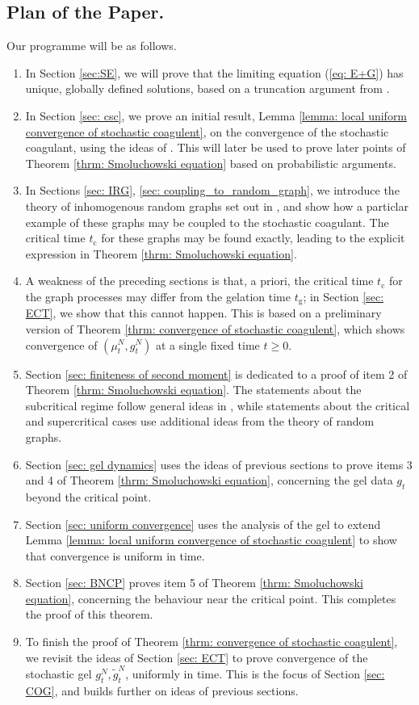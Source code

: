 \documentclass[11pt, notitlepage]{article}
\begin{document}
\subsection{\textbf{Plan of the Paper.}} Our programme will be as follows. \begin{enumerate} \item In Section \ref{sec:SE}, we will prove that the limiting equation (\ref{eq: E+G}) has unique, globally defined solutions, based on a truncation argument from \cite{N99,N00}.
\item In Section \ref{sec: csc}, we prove an initial result, Lemma \ref{lemma: local uniform convergence of stochastic coagulent}, on the convergence of the stochastic coagulant, using the ideas of \cite[Theorem 4.1]{N00}. This will later be used to prove later points of Theorem \ref{thrm: Smoluchowski equation} based on probabilistic arguments.
\item In Sections \ref{sec: IRG}, \ref{sec: coupling_to_random_graph}, we introduce the theory of inhomogenous random graphs set out in \cite{BJR07}, and show how a particlar example of these graphs may be coupled to the stochastic coagulant. The critical time $t_\mathrm{c}$ for these graphs may be found exactly, leading to the explicit expression in Theorem \ref{thrm: Smoluchowski equation}. \item A weakness of the preceding sections is that, a priori, the critical time $t_\mathrm{c}$ for the graph processes may differ from the gelation time $t_\mathrm{g}$; in Section \ref{sec: ECT}, we show that this cannot happen. This is based on a preliminary version of Theorem \ref{thrm: convergence of stochastic coagulent}, which shows convergence of $(\mu^N_t, g^N_t)$ at a single fixed time $t\ge 0$. 
\item Section \ref{sec: finiteness of second moment} is dedicated to a proof of item 2 of Theorem \ref{thrm: Smoluchowski equation}. The statements about the subcritical regime follow general ideas in \cite{N99,N00}, while statements about the critical and supercritical cases use additional ideas from the theory of random graphs.
\item Section \ref{sec: gel dynamics} uses the ideas of previous sections to prove items 3 and 4 of Theorem \ref{thrm: Smoluchowski equation}, concerning the gel data $g_t$ beyond the critical point. \item Section \ref{sec: uniform convergence} uses the analysis of the gel to extend Lemma \ref{lemma: local uniform convergence of stochastic coagulent} to show that convergence is uniform in time.
\item Section \ref{sec: BNCP} proves item 5 of Theorem \ref{thrm: Smoluchowski equation}, concerning the behaviour near the critical point. This completes the proof of this theorem. \item To finish the proof of Theorem \ref{thrm: convergence of stochastic coagulent}, we revisit the ideas of Section \ref{sec: ECT} to prove convergence of the stochastic gel $g^N_t, \widetilde{g}^N_t$, uniformly in time. This is the focus of Section \ref{sec: COG}, and builds further on ideas of previous sections. \end{enumerate}
\end{document}
